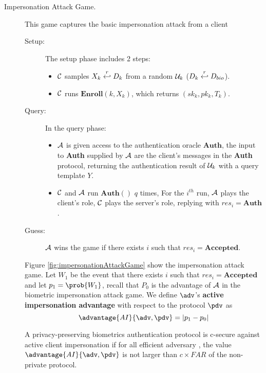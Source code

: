 \begin{description}
\begin{description}
  \item[Impersonation Attack Game.] This game captures the basic impersonation attack from a client
    \begin{description}
    \item[Setup:] The setup phase includes 2 steps:
      \begin{itemize}
      \item $\mathcal{C}$ samples $X_k \stackrel{r}{\hookleftarrow} D_{k}$ from a random
        $\mathcal{U}_k$ ($D_k \stackrel{r}{\hookleftarrow} D_{bio}$).
      \item $\mathcal{C}$ runs $\textbf{Enroll}(k, X_k)$, which returns $(sk_k, pk_{k}, T_k)$.
      \end{itemize}
    \item[Query:] In the query phase:
      \begin{itemize}
      \item $\mathcal{A}$ is given access to the authentication oracle
        $\mathbf{Auth}$, the input to \textbf{Auth} supplied by $\mathcal{A}$ are
        the client's messages in the \textbf{Auth} protocol, returning the
        authentication result of $\mathcal{U}_k$ with a query template $Y$.

      \item $\mathcal{C}$ and $\mathcal{A}$ run $\mathbf{Auth()}$ $q$ times, For
        the $i^{th}$ run, $\mathcal{A}$ plays the client's role, $\mathcal{C}$ plays the server's role,
        replying with $res_i = \mathbf{Auth}$.
      \end{itemize}
    \item[Guess:] $\mathcal{A}$ wins the game if there exists $i$ such that $res_{i} = \textbf{Accepted}$.
    \end{description}
    Figure \ref{fig:impersonationAttackGame} show the impersonation attack
    game. Let $W_{1}$ be the event that there exists $i$ such that
    $res_{i} = \mathbf{Accepted}$ and let $p_{1} = \prob{W_{1}} $, recall that
    $P_{0}$ is the advantage of $\mathcal{A}$ in the biometric impersonation
    attack game. We define $\adv$'s \textbf{active impersonation advantage} with
    respect to the protocol $\pdv$ as
    \[
      \advantage{AI}{\adv,\pdv} = |p_{1} - p_{0}|
    \]
    \begin{definition}
       A privacy-preserving biometrics
      authentication protocol \pdv is c-secure against active client
      impersonation if for all efficient adversary \adv, the value
      $\advantage{AI}{\adv,\pdv}$ is not larger than $c \times FAR$ of the
      non-private protocol.
    \end{definition}
      

\end{description}
\end{description}
